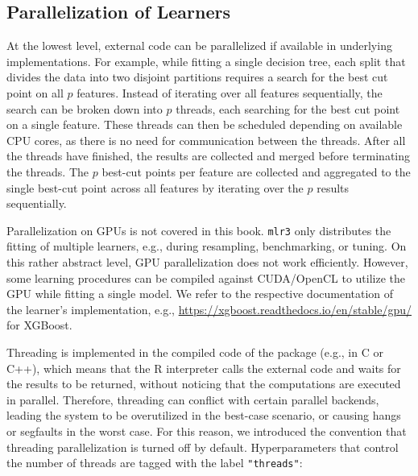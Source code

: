 \hypertarget{sec-parallel-learner}{%
\subsection{Parallelization of Learners}\label{sec-parallel-learner}}

At the lowest level, external code can be parallelized if available in
underlying implementations. For example, while fitting a single decision
tree, each split that divides the data into two disjoint partitions
requires a search for the best cut point on all \(p\) features. Instead
of iterating over all features sequentially, the search can be broken
down into \(p\) threads, each searching for the best cut point on a
single feature. These threads can then be scheduled depending on
available CPU cores, as there is no need for communication between the
threads. After all the threads have finished, the results are collected
and merged before terminating the threads. The \(p\) best-cut points per
feature are collected and aggregated to the single best-cut point across
all features by iterating over the \(p\) results sequentially.

\begin{tcolorbox}[enhanced jigsaw, opacitybacktitle=0.6, rightrule=.15mm, opacityback=0, arc=.35mm, breakable, titlerule=0mm, colframe=quarto-callout-tip-color-frame, coltitle=black, bottomrule=.15mm, toprule=.15mm, colback=white, colbacktitle=quarto-callout-tip-color!10!white, bottomtitle=1mm, toptitle=1mm, title=\textcolor{quarto-callout-tip-color}{\faLightbulb}\hspace{0.5em}{GPU Computation}, leftrule=.75mm, left=2mm]

Parallelization on GPUs is not covered in this book. \texttt{mlr3} only
distributes the fitting of multiple learners, e.g., during resampling,
benchmarking, or tuning. On this rather abstract level, GPU
parallelization does not work efficiently. However, some learning
procedures can be compiled against CUDA/OpenCL to utilize the GPU while
fitting a single model. We refer to the respective documentation of the
learner's implementation, e.g.,
\url{https://xgboost.readthedocs.io/en/stable/gpu/} for XGBoost.

\end{tcolorbox}

Threading is implemented in the compiled code of the
package (e.g., in C or C++), which means that the R interpreter calls
the external code and waits for the results to be returned, without
noticing that the computations are executed in parallel. Therefore,
threading can conflict with certain parallel backends, leading the
system to be overutilized in the best-case scenario, or causing hangs or
segfaults in the worst case. For this reason, we introduced the
convention that threading parallelization is turned off by default.
Hyperparameters that control the number of threads are tagged with the
label \texttt{"threads"}:

